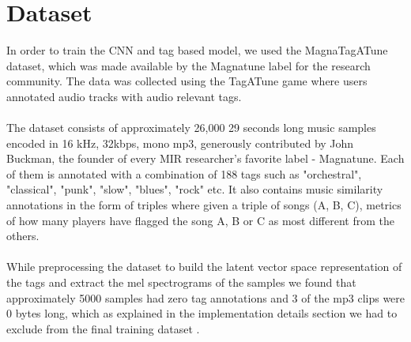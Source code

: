 \documentclass[11pt, a4paper]{article}
\begin{document}
  \section{Dataset}
    In order to train the CNN and tag based model, we used the MagnaTagATune
    dataset, which was made available by the Magnatune label for the research
    community. The data was collected using the TagATune game where users
    annotated audio tracks with audio relevant tags.
    \\ \\
    \noindent
    The dataset consists of approximately 26,000 29 seconds long music samples
    encoded in 16 kHz, 32kbps, mono mp3, generously contributed by John
    Buckman, the founder of every MIR researcher's favorite label - Magnatune.
    Each of them is annotated with a combination of 188 tags such as
    "orchestral", "classical", "punk", "slow", "blues", "rock" etc. It also
    contains music similarity annotations in the form of triples where given a
    triple of songs (A, B, C), metrics of how many players have flagged the
    song A, B or C as most different from the others.
    \\ \\
    \noindent
    While preprocessing the dataset to build the latent vector space
    representation of the tags and extract the mel spectrograms of the samples
    we found that approximately 5000 samples had zero tag annotations and 3 of
    the mp3 clips were 0 bytes long, which as explained in the implementation
    details section we had to exclude from the final training dataset
    \cite{magnatagatune}.
\end{document}
